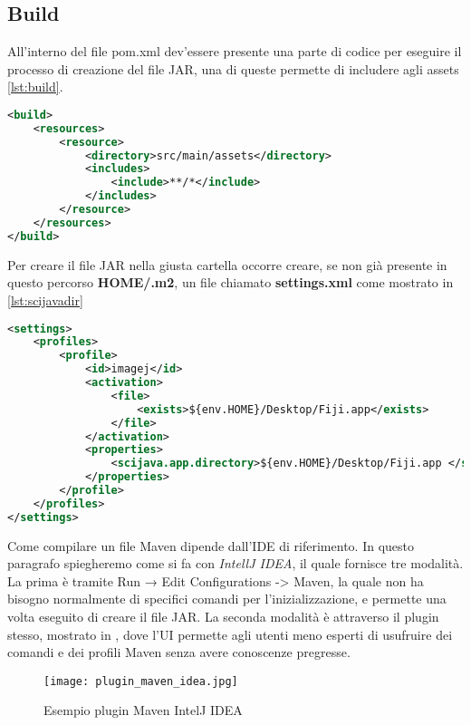 \subsection{Build}
\noindent All'interno del file pom.xml dev'essere presente una parte di codice per eseguire il processo di creazione del file JAR, una di queste permette di includere agli assets \ref{lst:build}.

\begin{lstlisting}[language=XML, caption={"pom.xml, sottosezione build"}, label=lst:build]
<build>
	<resources>
        <resource>
            <directory>src/main/assets</directory>
            <includes>
                <include>**/*</include>
            </includes>
        </resource>
    </resources>
</build>
\end{lstlisting}

\noindent Per creare il file JAR nella giusta cartella occorre creare, se non già presente in questo percorso
\textbf{HOME/.m2}, un file chiamato \textbf{settings.xml} come mostrato in \ref{lst:scijavadir}

\begin{lstlisting}[language=XML, caption={"settings.xml valido per Fiji}, label={lst:scijavadir}]
<settings>
    <profiles>
        <profile>
            <id>imagej</id>
            <activation>
                <file>
                    <exists>${env.HOME}/Desktop/Fiji.app</exists>
                </file>
            </activation>
            <properties>
                <scijava.app.directory>${env.HOME}/Desktop/Fiji.app </scijava.app.directory>
            </properties>
        </profile>
    </profiles>
</settings>
\end{lstlisting}

\noindent Come compilare un file Maven dipende dall'IDE di riferimento. In questo paragrafo spiegheremo come si fa con \textit{IntellJ IDEA}, il quale fornisce tre modalità. La prima è tramite Run → Edit Configurations -> Maven, la quale non ha bisogno normalmente di specifici comandi per l'inizializzazione, e permette una volta eseguito di creare il file JAR. La seconda modalità è attraverso il plugin stesso, mostrato in , dove l'UI permette agli utenti meno esperti di usufruire dei comandi e dei profili Maven senza avere conoscenze pregresse.

\begin{figure}[H]
    \centering
    \texttt{[image: plugin\_maven\_idea.jpg]}
    \caption{Esempio plugin Maven IntelJ IDEA}
    \label{fig:8}
\end{figure}

